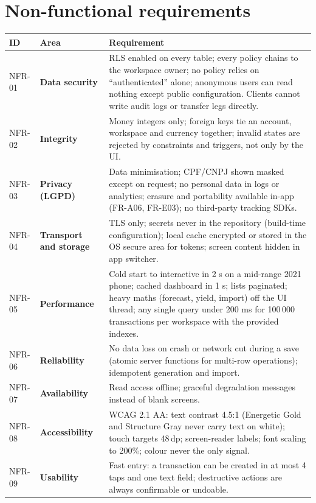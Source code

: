 \documentclass[11pt,a4paper]{article}
\begin{document}
\section{Non-functional requirements}
\begin{tabularx}{\textwidth}{@{}l >{\bfseries}l X@{}}
\toprule
\textbf{ID} & \textbf{Area} & \textbf{Requirement} \\
\midrule
NFR-01 & Data security & RLS enabled on every table; every policy chains to the workspace owner; no policy relies on ``authenticated'' alone; anonymous users can read nothing except public configuration. Clients cannot write audit logs or transfer legs directly. \\
NFR-02 & Integrity & Money integers only; foreign keys tie an account, workspace and currency together; invalid states are rejected by constraints and triggers, not only by the UI. \\
NFR-03 & Privacy (LGPD) & Data minimisation; CPF/CNPJ shown masked except on request; no personal data in logs or analytics; erasure and portability available in-app (FR-A06, FR-E03); no third-party tracking SDKs. \\
NFR-04 & Transport and storage & TLS only; secrets never in the repository (build-time configuration); local cache encrypted or stored in the OS secure area for tokens; screen content hidden in app switcher. \\
NFR-05 & Performance & Cold start to interactive in 2 s on a mid-range 2021 phone; cached dashboard in 1 s; lists paginated; heavy maths (forecast, yield, import) off the UI thread; any single query under 200 ms for 100\,000 transactions per workspace with the provided indexes. \\
NFR-06 & Reliability & No data loss on crash or network cut during a save (atomic server functions for multi-row operations); idempotent generation and import. \\
NFR-07 & Availability & Read access offline; graceful degradation messages instead of blank screens. \\
NFR-08 & Accessibility & WCAG 2.1 AA: text contrast 4.5:1 (Energetic Gold and Structure Gray never carry text on white); touch targets 48\,dp; screen-reader labels; font scaling to 200\%; colour never the only signal. \\
NFR-09 & Usability & Fast entry: a transaction can be created in at most 4 taps and one text field; destructive actions are always confirmable or undoable. \\

\end{tabularx}
\end{document}
